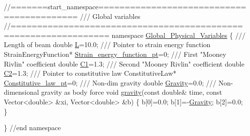  
\begin{DoxyCodeInclude}
\textcolor{comment}{//=======start\_namespace==========================================}
\textcolor{comment}{/// Global variables}
\textcolor{comment}{}\textcolor{comment}{//================================================================}
\textcolor{keyword}{namespace }\hyperlink{namespaceGlobal__Physical__Variables}{Global\_Physical\_Variables}
\{
\textcolor{comment}{}
\textcolor{comment}{ /// Length of beam}
\textcolor{comment}{} \textcolor{keywordtype}{double} \hyperlink{namespaceGlobal__Physical__Variables_a1b8bfc451f6b7ac89eca18f04338f47f}{L}=10.0;
\textcolor{comment}{}
\textcolor{comment}{ /// Pointer to strain energy function}
\textcolor{comment}{} StrainEnergyFunction* \hyperlink{namespaceGlobal__Physical__Variables_a73135f793690b4386bf83bbefc7bf310}{Strain\_energy\_function\_pt}=0;
\textcolor{comment}{}
\textcolor{comment}{ /// First "Mooney Rivlin" coefficient }
\textcolor{comment}{} \textcolor{keywordtype}{double} \hyperlink{namespaceGlobal__Physical__Variables_a849754fa7155c1a31481674ce4845658}{C1}=1.3;
\textcolor{comment}{}
\textcolor{comment}{ /// Second "Mooney Rivlin" coefficient }
\textcolor{comment}{} \textcolor{keywordtype}{double} \hyperlink{namespaceGlobal__Physical__Variables_af9defd1b5745cce50d2c386b3ac0e0ae}{C2}=1.3;
\textcolor{comment}{}
\textcolor{comment}{ /// Pointer to constitutive law}
\textcolor{comment}{} ConstitutiveLaw* \hyperlink{namespaceGlobal__Physical__Variables_a2a37fb040c832ee7a086bb13bb02a100}{Constitutive\_law\_pt}=0;
\textcolor{comment}{}
\textcolor{comment}{ /// Non-dim gravity}
\textcolor{comment}{} \textcolor{keywordtype}{double} \hyperlink{namespaceGlobal__Physical__Variables_a8b80d3e8d63b8d0a0ed435a2dd7fe2ad}{Gravity}=0.0;
\textcolor{comment}{}
\textcolor{comment}{ /// Non-dimensional gravity as body force}
\textcolor{comment}{} \textcolor{keywordtype}{void} \hyperlink{namespaceGlobal__Physical__Variables_a0777aef63372db7f91ad894c38159681}{gravity}(\textcolor{keyword}{const} \textcolor{keywordtype}{double}& time, 
              \textcolor{keyword}{const} Vector<double> &xi, 
              Vector<double> &b)
 \{
  b[0]=0.0;
  b[1]=-\hyperlink{namespaceGlobal__Physical__Variables_a8b80d3e8d63b8d0a0ed435a2dd7fe2ad}{Gravity};
  b[2]=0.0;
 \}
 
\} \textcolor{comment}{//end namespace}

\end{DoxyCodeInclude}




